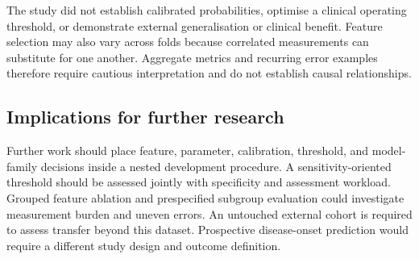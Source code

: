 The study did not establish calibrated probabilities, optimise a clinical operating threshold, or demonstrate external generalisation or clinical benefit. Feature selection may also vary across folds because correlated measurements can substitute for one another. Aggregate metrics and recurring error examples therefore require cautious interpretation and do not establish causal relationships.

\subsection{Implications for further research}
Further work should place feature, parameter, calibration, threshold, and model-family decisions inside a nested development procedure. A sensitivity-oriented threshold should be assessed jointly with specificity and assessment workload. Grouped feature ablation and prespecified subgroup evaluation could investigate measurement burden and uneven errors. An untouched external cohort is required to assess transfer beyond this dataset. Prospective disease-onset prediction would require a different study design and outcome definition.
